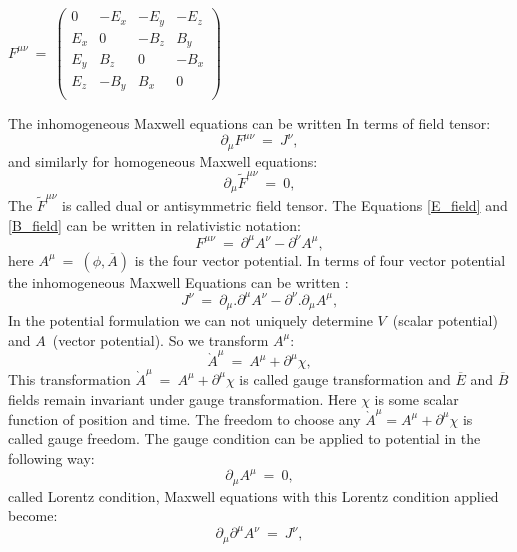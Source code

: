 \begin{center}
$F^{\mu\nu}$~=~$\begin{pmatrix}
0 & -E_{x} & -E_{y} & -E_{z}\\
E_{x} & 0 & -B_{z} & B_{y}\\
E_{y} & B_{z} & 0 & -B_{x}\\
E_{z} & -B_{y} & B_{x} &0\\
\end{pmatrix}$
\end{center}
The inhomogeneous Maxwell equations can be written In terms of field tensor:
\begin{equation}
\partial_{\mu}F^{\mu\nu}~=~J^{\nu},
\end{equation}
and similarly for homogeneous Maxwell equations:
\begin{equation}
\partial_{\mu}\tilde{F}^{\mu\nu}~=~0,
\end{equation}
The $\tilde{F}^{\mu\nu}$ is called dual or antisymmetric field tensor. The Equations \ref{E_field} and \ref{B_field} can be written in relativistic notation:
\begin{equation}
F^{\mu\nu}~=~\partial^{\mu}A^{\nu}-\partial^{\nu}A^{\mu},
\end{equation}
here $A^{\mu}~=~(\phi,\overline{A})$ is the four vector potential. In terms of four vector potential the inhomogeneous Maxwell Equations can be written :
\begin{equation}
J^{\nu}~=~\partial_{\mu}.\partial^{\mu}A^{\nu}-\partial^{\nu}.\partial_{\mu}A^{\mu},
\end{equation}
In the potential formulation we can not uniquely determine $V$~(scalar potential) and $A$~(vector potential). So we transform $A^{\mu}$:
\begin{equation}
\grave{A}^{\mu}~=~A^{\mu}+\partial^{\mu}\chi,
\end{equation}
This transformation $\grave{A}^{\mu}~=~A^{\mu}+\partial^{\mu}\chi$ is called gauge transformation and $\overline{E}$ and $\overline{B}$ fields remain invariant under gauge transformation. Here $\chi$ is some scalar function of position and time. The freedom to choose any $\grave{A}^{\mu}=A^{\mu}+\partial^{\mu}\chi$ is called gauge freedom. The gauge condition can be applied to potential in the following way:
\begin{equation}
\partial_{\mu}A^{\mu}~=~0,
\end{equation}
called Lorentz condition, Maxwell equations with this Lorentz condition applied become:
\begin{equation}
\partial_{\mu}\partial^{\mu}A^{\nu}~=~J^{\nu},
\end{equation}
